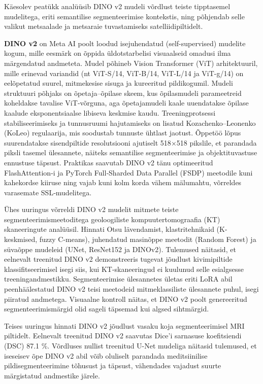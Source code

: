 Käesolev peatükk analüüsib DINO v2 mudeli võrdlust teiste tipptasemel mudelitega, eriti semantilise segmenteerimise kontekstis, ning põhjendab selle valikut metsaalade ja metsaraie tuvastamiseks satelliidipiltidelt.

\textbf{DINO v2} on Meta AI poolt loodud isejuhendatud (self-supervised) mudelite kogum,
mille eesmärk on õppida üldotstarbelisi visuaalseid omadusi ilma märgendatud
andmeteta. Mudel põhineb Vision Transformer (ViT) arhitektuuril, mille erinevad
variandid (nt ViT-S/14, ViT-B/14, ViT-L/14 ja ViT-g/14) on eelõpetatud suurel,
mitmekesise sisuga ja kureeritud pildikogumil. Mudeli struktuuri põhjaks on
õpetaja--õpilase skeem, kus õpilasmudeli parameetreid koheldakse tavalise ViT‑võrguna, aga õpetajamudeli
kaale uuendatakse õpilase kaalude eksponentsiaalse libiseva keskmise kaudu.
Treeningprotsessi stabiliseerimiseks ja tunnusruumi hajutamiseks on lisatud
Kozachenko--Leonenko (KoLeo) regulaarija, mis soodustab tunnuste ühtlast jaotust.
Õppetöö lõpus suurendatakse sisendpiltide resolutsiooni
ajutiselt 518\(\times \)518 pikslile, et parandada piksli tasemel
ülesannete, näiteks semantilise segmenteerimise ja objektituvastuse ennustuse
täpsust. Praktikas saavutab DINO v2 tänu optimeeritud
FlashAttention‑i ja PyTorch Full‑Sharded Data Parallel (FSDP) meetodile kuni
kahekordse kiiruse ning vajab kuni kolm korda vähem mälumahtu, võrreldes varasemate SSL‑mudelitega. \cite{oquabDINOv2LearningRobust2024}

Ühes uuringus võrreldi DINO v2 mudelit mitmete teiste segmenteerimismeetoditega
 geoloogiliste kompuutertomograafia (KT) skaneeringute analüüsil. Hinnati Otsu
 lävendamist, klastritehnikaid (K-keskmised, fuzzy C-means), juhendatud
 masinõppe meetodit (Random Forest) ja süvaõppe mudeleid (UNet, ResNet152 ja
 DINOv2). Tulemused näitasid, et eelnevalt treenitud DINO v2 demonstreeris
 tugevat jõudlust kivimipiltide klassifitseerimisel isegi siis, kui
 KT-skaneeringud ei kuulunud selle esialgsesse treeningandmestikku.
 Segmenteerimise ülesannetes ületas eriti LoRA abil peenhäälestatud DINO v2
 teisi meetodeid mitmeklassiliste ülesannete puhul, isegi piiratud andmetega.
 Visuaalne kontroll näitas, et DINO v2 poolt genereeritud segmenteerimismärgid
 olid sageli täpsemad kui algsed sihtmärgid. \cite{DINOv2RocksGeological}

Teises uuringus hinnati DINO v2 jõudlust vasaku koja segmenteerimisel MRI
 piltidelt. Eelnevalt treenitud DINO v2 saavutas Dice'i sarnasuse koefitsiendi
 (DSC)  87.1 \%. Võrdluses nullist treenitud U-Net
 mudeliga näitasid tulemused, et iseseisev õpe DINO v2 abil võib oluliselt
 parandada meditsiinilise pildisegmenteerimine tõhusust ja täpsust, vähendades
 vajadust suurte märgistatud andmestike järele. \cite{kunduAssessingPerformanceDINOv22024}

